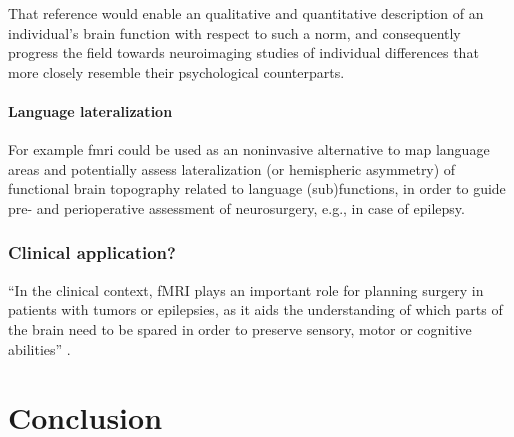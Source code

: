 %
That reference would enable an qualitative and quantitative description of an
individual's brain function with respect to such a norm, and consequently
progress the field towards neuroimaging studies of individual differences that
more closely resemble their psychological counterparts.


\paragraph{Language lateralization}


%
For example \ac{fmri} could be used as an noninvasive alternative to map
language areas and potentially assess lateralization (or hemispheric asymmetry)
of functional brain topography related to language (sub)functions, in order to
guide pre- and perioperative assessment of neurosurgery, e.g., in case of
epilepsy.



\subsubsection{Clinical application?}




``In the clinical context, fMRI plays an important role for planning surgery in
patients with tumors or epilepsies, as it aids the understanding of which parts
of the brain need to be spared in order to preserve sensory, motor or cognitive
abilities'' \citep{wegrzyn2018thought}.



\section{Conclusion}

